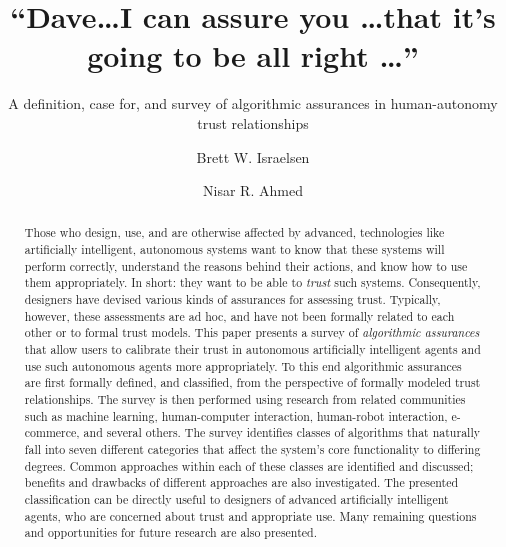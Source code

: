 \documentclass[format=manuscript, screen,review=true]{acmart}
\begin{document}
\title{``Dave\ldots I can assure you \ldots that it's going to be all right \ldots''} 
\subtitle{A definition, case for, and survey of algorithmic assurances in human-autonomy trust relationships}
\author{Brett W. Israelsen}
\author{Nisar R. Ahmed}

\begin{abstract}
    Those who design, use, and are otherwise affected by advanced, technologies like artificially intelligent, autonomous systems want to know that these systems will perform correctly, understand the reasons behind their actions, and know how to use them appropriately. 
    In short: they want to be able to \emph{trust} such systems. Consequently, designers have devised various kinds of assurances for assessing trust.
    Typically, however, these assessments are ad hoc, and have not been formally related to each other or to formal trust models.  This paper presents a survey of \emph{algorithmic assurances} that allow users to calibrate their trust in autonomous artificially intelligent agents and use such autonomous agents more appropriately. To this end algorithmic assurances are first formally defined, and classified, from the perspective of formally modeled trust relationships. The survey is then performed using research from related communities such as machine learning, human-computer interaction, human-robot interaction, e-commerce, and several others. The survey identifies classes of algorithms that naturally fall into seven different categories that affect the system's core functionality to differing degrees. Common approaches within each of these classes are identified and discussed; benefits and drawbacks of different approaches are also investigated. The presented classification can be directly useful to designers of advanced artificially intelligent agents, who are concerned about trust and appropriate use. Many remaining questions and opportunities for future research are also presented.
\end{abstract}
\end{document}
